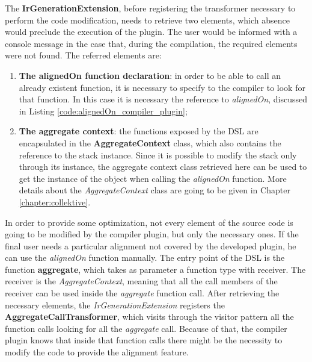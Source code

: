 The \textbf{IrGenerationExtension}, before registering the transformer necessary to perform the code modification, needs to retrieve two elements, which absence would preclude the execution of the plugin. The user would be informed with a console message in the case that, during the compilation, the required elements were not found.\newline
The referred elements are:
\begin{enumerate}
    \item \textbf{The alignedOn function declaration}: in order to be able to call an already existent function, it is necessary to specify to the compiler to look for that function. In this case it is necessary the reference to \textit{alignedOn}, discussed in Listing \ref{code:alignedOn_compiler_plugin};
    \item \textbf{The aggregate context}: the functions exposed by the DSL are encapsulated in the \textbf{AggregateContext} class, which also contains the reference to the stack instance. Since it is possible to modify the stack only through its instance, the aggregate context class retrieved here can be used to get the instance of the object when calling the \textit{alignedOn} function. More details about the \textit{AggregateContext} class are going to be given in Chapter \ref{chapter:collektive}.
\end{enumerate}

In order to provide some optimization, not every element of the source code is going to be modified by the compiler plugin, but only the necessary ones. If the final user needs a particular alignment not covered by the developed plugin, he can use the \textit{alignedOn} function manually.\newline
The entry point of the DSL is the function \textbf{aggregate}, which takes as parameter a function type with receiver. The receiver is the \textit{AggregateContext}, meaning that all the call members of the receiver can be used inside the \textit{aggregate} function call.\newline
After retrieving the necessary elements, the \textit{IrGenerationExtension} registers the \textbf{AggregateCallTransformer}, which visits through the visitor pattern all the function calls looking for all the \textit{aggregate} call. Because of that, the compiler plugin knows that inside that function calls there might be the necessity to modify the code to provide the alignment feature.


